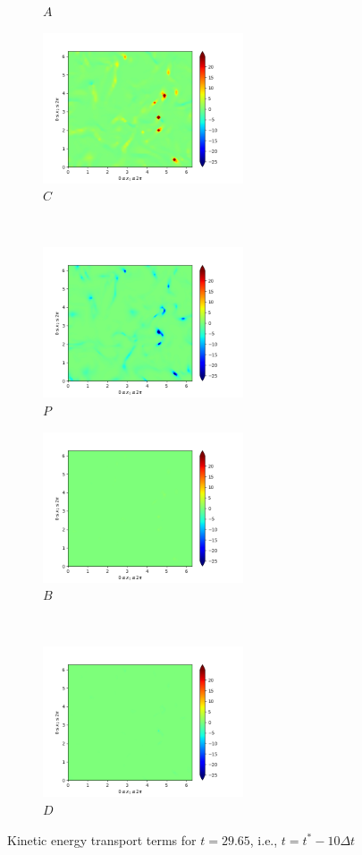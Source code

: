 \begin{figure}[H]
\begin{subfigure}{0.45\textwidth}
        \caption{$A$}
    \end{subfigure}
    \newline
    \begin{subfigure}{0.45\textwidth}
        \includegraphics[height=1.75in]{media/run-cds-65/C-ke-1330.png}
        \caption{$C$}
    \end{subfigure}
    ~
    \begin{subfigure}{0.45\textwidth}
        \includegraphics[height=1.75in]{media/run-cds-65/P-ke-1330.png}
        \caption{$P$}
    \end{subfigure}
    \newline
    \begin{subfigure}{0.45\textwidth}
        \includegraphics[height=1.75in]{media/run-cds-65/B-ke-1330.png}
        \caption{$B$}
    \end{subfigure}
    ~
    \begin{subfigure}{0.45\textwidth}
        \includegraphics[height=1.75in]{media/run-cds-65/D-ke-1330.png}
        \caption{$D$}
    \end{subfigure}
    \caption{Kinetic energy transport terms for $t=29.65$, i.e., $t=t^{\ast} - 10 \Delta t$}
\end{figure}

